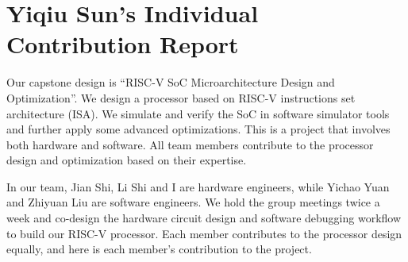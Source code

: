 \chapter*{Yiqiu Sun's Individual Contribution Report}

Our capstone design is ``RISC-V SoC Microarchitecture Design and Optimization''. We design a processor based on RISC-V instructions set architecture (ISA). We simulate and verify the SoC in software simulator tools and further apply some advanced optimizations. This is a project that involves both hardware and software. All team members contribute to the processor design and optimization based on their expertise.

In our team, Jian Shi, Li Shi and I are hardware engineers, while Yichao Yuan and Zhiyuan Liu are software engineers. We hold the group meetings twice a week and co-design the hardware circuit design and software debugging workflow to build our RISC-V processor. Each member contributes to the processor design equally, and here is each member’s contribution to the project.

